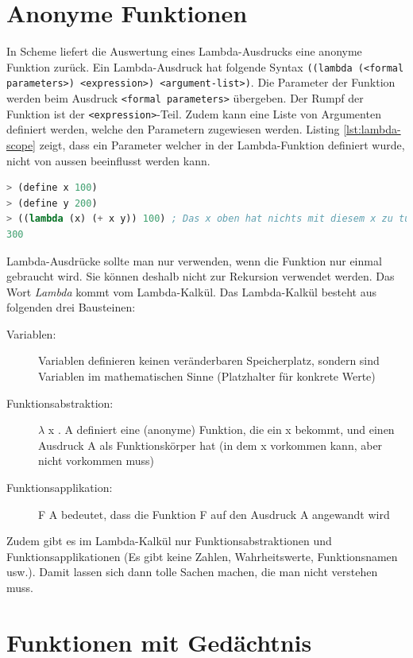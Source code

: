 \section{Anonyme Funktionen}

In Scheme liefert die Auswertung eines Lambda-Ausdrucks eine anonyme Funktion zurück. Ein Lambda-Ausdruck hat folgende Syntax \verb|((lambda (<formal parameters>) <expression>) <argument-list>)|. Die Parameter der Funktion werden beim Ausdruck \verb|<formal parameters>| übergeben. Der Rumpf der Funktion ist der \verb|<expression>|-Teil. Zudem kann eine Liste von Argumenten definiert werden, welche den Parametern zugewiesen werden. Listing \ref{lst:lambda-scope} zeigt, dass ein Parameter welcher in der Lambda-Funktion definiert wurde, nicht von aussen beeinflusst werden kann.

\begin{lstlisting}[language=Lisp, caption=Scope eines Lambda-Ausdrucks, label=lst:lambda-scope]
> (define x 100)
> (define y 200)
> ((lambda (x) (+ x y)) 100) ; Das x oben hat nichts mit diesem x zu tun
300
\end{lstlisting}

Lambda-Ausdrücke sollte man nur verwenden, wenn die Funktion nur einmal gebraucht wird. Sie können deshalb nicht zur Rekursion verwendet werden. Das Wort \textit{Lambda} kommt vom Lambda-Kalkül. Das Lambda-Kalkül besteht aus folgenden drei Bausteinen:
\begin{description}
	\item[Variablen:] Variablen definieren keinen veränderbaren Speicherplatz, sondern sind Variablen im mathematischen Sinne (Platzhalter für konkrete Werte)
	\item[Funktionsabstraktion:]  $\lambda$ x . A definiert eine (anonyme) Funktion, die ein x bekommt, und einen Ausdruck A als Funktionskörper hat (in dem x vorkommen kann, aber nicht vorkommen muss)
	\item[Funktionsapplikation:] F A bedeutet, dass die Funktion F auf den Ausdruck A angewandt wird
\end{description}
Zudem gibt es im Lambda-Kalkül nur Funktionsabstraktionen und Funktionsapplikationen (Es gibt keine Zahlen, Wahrheitswerte, Funktionsnamen usw.). Damit lassen sich dann tolle Sachen machen, die man nicht verstehen muss.

\section{Funktionen mit Gedächtnis}

